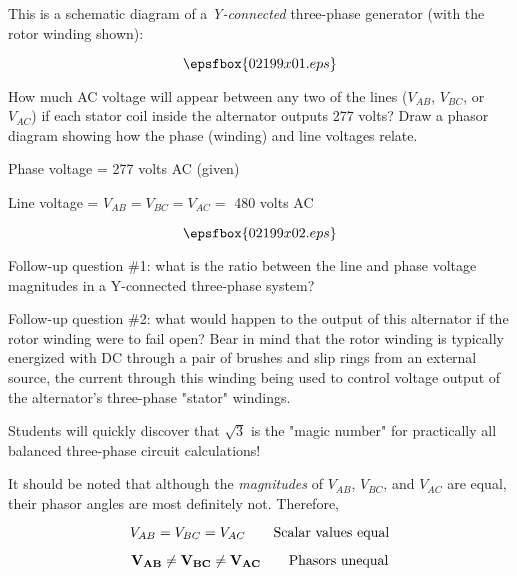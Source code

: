 

This is a schematic diagram of a {\it Y-connected} three-phase generator (with the rotor winding shown):

$$\epsfbox{02199x01.eps}$$

How much AC voltage will appear between any two of the lines ($V_{AB}$, $V_{BC}$, or $V_{AC}$) if each stator coil inside the alternator outputs 277 volts?  Draw a phasor diagram showing how the phase (winding) and line voltages relate.







Phase voltage = 277 volts AC (given)

Line voltage = $V_{AB} = V_{BC} = V_{AC} =$ 480 volts AC

$$\epsfbox{02199x02.eps}$$

\vskip 10pt

Follow-up question \#1: what is the ratio between the line and phase voltage magnitudes in a Y-connected three-phase system?

\vskip 10pt

Follow-up question \#2: what would happen to the output of this alternator if the rotor winding were to fail open?  Bear in mind that the rotor winding is typically energized with DC through a pair of brushes and slip rings from an external source, the current through this winding being used to control voltage output of the alternator's three-phase "stator" windings.







Students will quickly discover that $\sqrt{3}$ is the "magic number" for practically all balanced three-phase circuit calculations!

It should be noted that although the {\it magnitudes} of $V_{AB}$, $V_{BC}$, and $V_{AC}$ are equal, their phasor angles are most definitely not.  Therefore,

$$V_{AB} = V_{BC} = V_{AC} \hbox{\hskip 20pt Scalar values equal}$$

$${\bf V_{AB}} \neq {\bf V_{BC}} \neq {\bf V_{AC}} \hbox{\hskip 20pt Phasors unequal}$$




